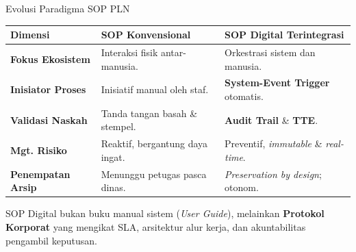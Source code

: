 \documentclass[aspectratio=169,11pt]{beamer}
\begin{document}
\begin{frame}[fragile]{Evolusi Paradigma SOP PLN}
    \begin{table}
        \centering
        \scriptsize
        \begin{tabularx}{\textwidth}{@{} >{\raggedright\arraybackslash}p{2.5cm} X X @{}}
            \toprule
            \textbf{Dimensi} & \textbf{SOP Konvensional} & \textbf{SOP Digital Terintegrasi} \\
            \midrule
            \textbf{Fokus Ekosistem} & Interaksi fisik antar-manusia. & Orkestrasi sistem dan manusia. \\
            \textbf{Inisiator Proses} & Inisiatif manual oleh staf. & \textbf{System-Event Trigger} otomatis. \\
            \textbf{Validasi Naskah} & Tanda tangan basah \& stempel. & \textbf{Audit Trail} \& \textbf{TTE}. \\
            \textbf{Mgt. Risiko} & Reaktif, bergantung daya ingat. & Preventif, \textit{immutable} \& \textit{real-time}. \\
            \textbf{Penempatan Arsip} & Menunggu petugas pasca dinas. & \textit{Preservation by design}; otonom. \\
            \bottomrule
        \end{tabularx}
    \end{table}
    \begin{orangebox}
        \scriptsize SOP Digital bukan buku manual sistem (\textit{User Guide}), melainkan \textbf{Protokol Korporat} yang mengikat SLA, arsitektur alur kerja, dan akuntabilitas pengambil keputusan.
    \end{orangebox}
\end{frame}
\end{document}

